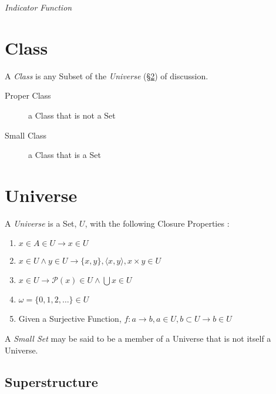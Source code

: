 \documentclass{article}
\begin{document}
\emph{Indicator Function}



\section{Class}\label{sec:class}

A \emph{Class} is any Subset of the \emph{Universe}
(\S\ref{sec:set_universe}) of discussion.

\begin{description}
    \item [Proper Class] a Class that is not a Set
    \item [Small Class] a Class that is a Set
\end{description}



\section{Universe}\label{sec:set_universe}

A \emph{Universe} is a Set, $U$, with the following Closure Properties
\cite{maclane69}:
\begin{enumerate}
\item $x \in A \in U \rightarrow x \in U$
\item $x \in U \wedge y \in U \rightarrow \{x,y\}, \langle x,y
  \rangle, x \times y \in U$
\item $x \in U \rightarrow \mathcal{P}(x) \in U \wedge \bigcup x \in U$
\item $\omega = \{0,1,2,\ldots\} \in U$
\item Given a Surjective Function, $f : a \rightarrow b, a \in
  U, b \subset U \rightarrow b \in U$
\end{enumerate}
A \emph{Small Set} may be said to be a member of a Universe that is
not itself a Universe.



\subsection{Superstructure}\label{subsec:superstructure}
\end{document}
